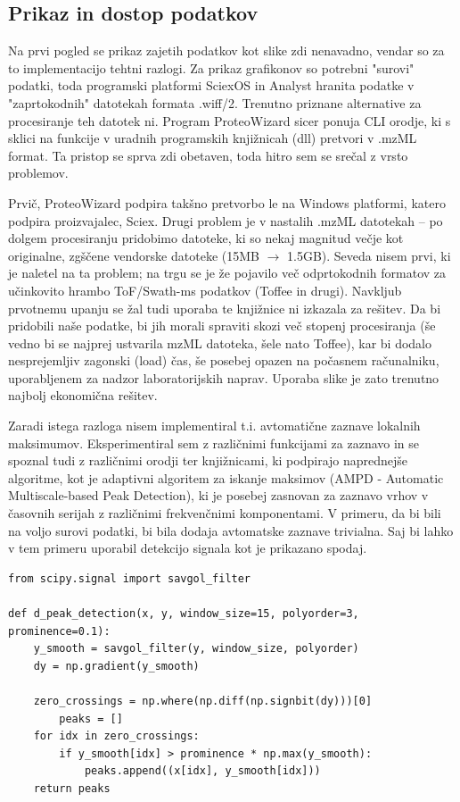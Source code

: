 \documentclass[a4paper,12pt]{article}
\begin{document}
\subsection{Prikaz in dostop podatkov}
Na prvi pogled se prikaz zajetih podatkov kot slike zdi nenavadno, vendar so za to implementacijo tehtni razlogi. Za prikaz grafikonov so potrebni "surovi" podatki, toda programski platformi SciexOS in Analyst hranita podatke v "zaprtokodnih" datotekah formata .wiff/2. Trenutno priznane alternative  za procesiranje teh datotek ni. Program ProteoWizard\cite{proteo} sicer ponuja CLI orodje, ki s sklici na funkcije v uradnih programskih knjižnicah (dll) pretvori v .mzML format. Ta pristop se sprva zdi obetaven, toda hitro sem se srečal z vrsto problemov.

Prvič, ProteoWizard podpira takšno pretvorbo le na Windows platformi, katero podpira proizvajalec, Sciex. Drugi problem je v nastalih .mzML datotekah – po dolgem procesiranju pridobimo datoteke, ki so nekaj magnitud večje kot originalne, zgščene vendorske datoteke (15MB $\rightarrow$ 1.5GB). Seveda nisem prvi, ki je naletel na ta problem; na trgu se je že pojavilo več odprtokodnih formatov\cite{toffee} za učinkovito hrambo ToF/Swath-ms podatkov (Toffee in drugi). Navkljub prvotnemu upanju se žal tudi uporaba te knjižnice ni izkazala za rešitev. Da bi pridobili naše podatke, bi jih morali spraviti skozi več stopenj procesiranja (še vedno bi se najprej ustvarila mzML datoteka, šele nato Toffee), kar bi dodalo nesprejemljiv zagonski (load) čas, še posebej opazen na počasnem računalniku, uporabljenem za nadzor laboratorijskih naprav. Uporaba slike je zato trenutno najbolj ekonomična rešitev.

Zaradi istega razloga nisem implementiral t.i. avtomatične zaznave lokalnih maksimumov. Eksperimentiral sem z različnimi funkcijami za zaznavo in se spoznal tudi z različnimi orodji ter knjižnicami\cite{pymassspec}, ki podpirajo naprednejše algoritme, kot je adaptivni algoritem za iskanje maksimov (AMPD - Automatic Multiscale-based Peak Detection), ki je posebej zasnovan za zaznavo vrhov v časovnih serijah z različnimi frekvenčnimi komponentami. V primeru, da bi bili na voljo surovi podatki, bi bila dodaja avtomatske zaznave trivialna. Saj bi lahko v tem primeru uporabil detekcijo signala kot je prikazano spodaj.
\begin{lstlisting}[caption={Uporaba Savitzky-Golay filtra za glajenje šuma, pri detekciji peak-ov}, label={lst:filters}]
from scipy.signal import savgol_filter

def d_peak_detection(x, y, window_size=15, polyorder=3, prominence=0.1):
    y_smooth = savgol_filter(y, window_size, polyorder)
    dy = np.gradient(y_smooth)
    
    zero_crossings = np.where(np.diff(np.signbit(dy)))[0]
        peaks = []
    for idx in zero_crossings:
        if y_smooth[idx] > prominence * np.max(y_smooth):
            peaks.append((x[idx], y_smooth[idx]))
    return peaks
\end{lstlisting}
\end{document}
